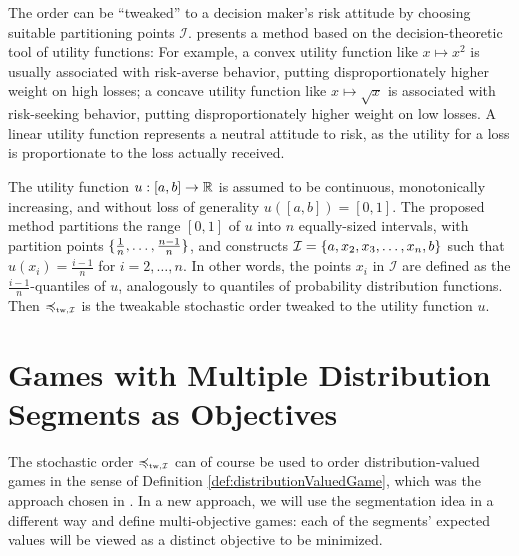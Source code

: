 \documentclass[a4paper]{scrreprt}
\theoremstyle{definition}
\begin{document}
    The order can be “tweaked” to a decision maker's risk attitude by choosing suitable partitioning points $\mathcal{I}$. \cite{bib:tweakableStochasticOrders} presents a method based on the decision-theoretic tool of utility functions: For example, a convex utility function like $x \mapsto x^2$ is usually associated with risk-averse behavior, putting disproportionately higher weight on high losses; a concave utility function like $x \mapsto \sqrt{x}$ is associated with risk-seeking behavior, putting disproportionately higher weight on low losses. A linear utility function represents a neutral attitude to risk, as the utility for a loss is proportionate to the loss actually received.
    
    The utility function $u: [a, b] \to \mathbb{R}$ is assumed to be continuous, monotonically increasing, and without loss of generality $u([a, b]) = [0, 1]$.
    The proposed method partitions the range $[0, 1]$ of $u$ into $n$ equally-sized intervals, with partition points $\{\frac{1}{n}, \dots, \frac{n-1}{n}\}$, and constructs $\mathcal{I} = \{a, x_2, x_3, \dots, x_n, b\}$ such that $u(x_i) = \frac{i-1}{n}$ for $i = 2, \dots, n$.
    In other words, the points $x_i$ in $\mathcal{I}$ are defined as the $\frac{i-1}{n}$-quantiles of $u$, analogously to quantiles of probability distribution functions. Then $\leqtw$ is the tweakable stochastic order tweaked to the utility function $u$.
    
    \section{Games with Multiple Distribution Segments as Objectives}
    The stochastic order $\leqtw$ can of course be used to order distribution-valued games in the sense of Definition \ref{def:distributionValuedGame}, which was the approach chosen in \cite{bib:tweakableStochasticOrders}.
    In a new approach, we will use the segmentation idea in a different way and define multi-objective games: each of the segments' expected values will be viewed as a distinct objective to be minimized.
    
\end{document}
